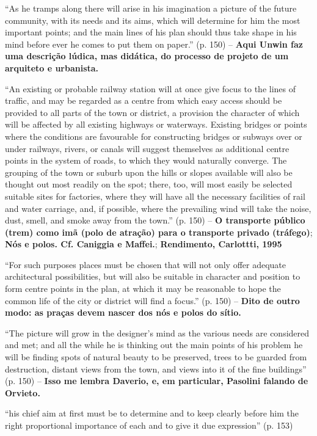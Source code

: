 \documentclass[12pt, a4paper]{book} %
\begin{document}
        ``As he tramps along there will arise in his imagination a picture of the future community, with its needs and its aims, which will determine for him the most important points; and the main lines of his plan should thus take shape in his mind before ever he comes to put them on paper.'' (p. 150) – \textbf{Aqui Unwin faz uma descrição lúdica, mas didática, do processo de projeto de um arquiteto e urbanista.}

        ``An existing or probable railway station will at once give focus to the lines of traffic, and may be regarded as a centre from which easy access should be provided to all parts of the town or district, a provision the character of which will be affected by all existing highways or waterways. Existing bridges or points where the conditions are favourable for constructing bridges or subways over or under railways, rivers, or canals will suggest themselves as additional centre points in the system of roads, to which they would naturally converge. The grouping of the town or suburb upon the hills or slopes available will also be thought out most readily on the spot; there, too, will most easily be selected suitable sites for factories, where they will have all the necessary facilities of rail and water carriage, and, if possible, where the prevailing wind will take the noise, dust, smell, and smoke away from the town.'' (p. 150) – \textbf{O transporte público (trem) como imã (polo de atração) para o transporte privado (tráfego)}; \textbf{Nós e polos. Cf. Caniggia e Maffei.}; \textbf{Rendimento, Carlottti, 1995}

        ``For such purposes places must be chosen that will not only offer adequate architectural possibilities, but will also be suitable in character and position to form centre points in the plan, at which it may be reasonable to hope the common life of the city or district will find a focus.'' (p. 150) – \textbf{Dito de outro modo: as praças devem nascer dos nós e polos do sítio.}

        ``The picture will grow in the designer's mind as the various needs are considered and met; and all the while he is thinking out the main points of his problem he will be finding spots of natural beauty to be preserved, trees to be guarded from destruction, distant views from the town, and views into it of the fine buildings'' (p. 150) – \textbf{Isso me lembra Daverio, e, em particular, Pasolini falando de Orvieto.}

        ``his chief aim at first must be to determine and to keep clearly before him the right proportional importance of each and to give it due expression'' (p. 153)
\end{document}
